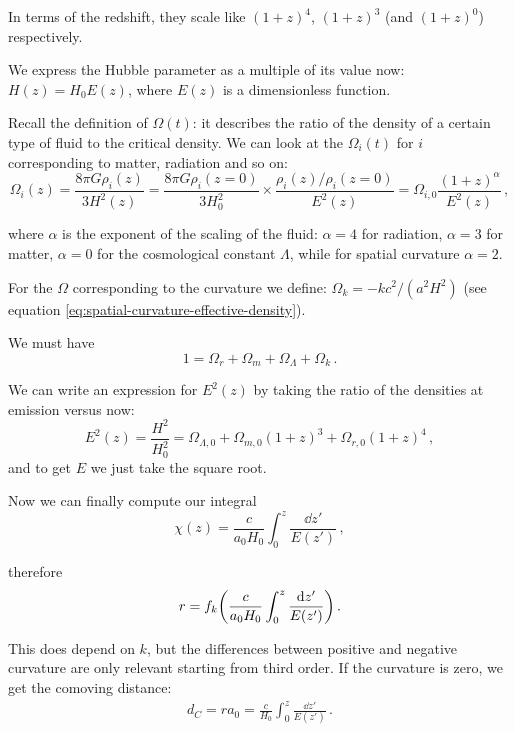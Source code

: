 \documentclass[main.tex]{subfiles}
\begin{document}
In terms of the redshift, they scale like \((1+z)^{4}\), \((1+z)^{3}\) (and \((1+z)^{0}\)) respectively.

We express the Hubble parameter as a multiple of its value now: \(H(z) = H_0 E(z)\), where \(E(z)\) is a dimensionless function.

Recall the definition of \(\Omega (t)\): it describes the ratio of the density of a certain type of fluid to the critical density. We can look at the \(\Omega_i (t)\) for \(i\) corresponding to matter, radiation and so on: 
%
\begin{equation}
  \Omega _i (z) = \frac{8 \pi G \rho _i (z)}{3 H^2(z)}
  = \frac{8 \pi G \rho_{i}(z=0)}{3 H_0 ^2} \times  \frac{\rho _i (z) / \rho_{i}(z=0)}{E^2(z)}
  = \Omega _{i,0} \frac{(1+z)^{\alpha }}{E^2(z)}
\,,
\end{equation}

where \(\alpha \) is the exponent of the scaling of the fluid: \(\alpha = 4\) for radiation, \(\alpha = 3\) for matter, \(\alpha = 0\) for the cosmological constant \(\Lambda \), while for spatial curvature \(\alpha = 2\).

For the \(\Omega \) corresponding to the curvature we define: \(\Omega _k = - k c^2/(a^2 H^2)\) (see equation \eqref{eq:spatial-curvature-effective-density}).

We must have 
%
\begin{equation}
  1 = \Omega _r + \Omega _m + \Omega _\Lambda + \Omega _k
\,.
\end{equation}

We can write an expression for \(E^2(z)\) by taking the ratio of the densities at emission versus now:
%
\begin{equation}
  E^2(z) = \frac{H^2}{H_0^2} = 
  \Omega _{\Lambda , 0} +  \Omega_{m, 0} (1+z)^{3}
  +\Omega_{r, 0} (1+z)^4
\,,
\end{equation}
%
and to get \(E\) we just take the square root.

Now we can finally compute our integral 
%
\begin{equation}
  \chi (z) = \frac{c}{a_0 H_0 } \int_{0}^{z} \frac{\dd{z'} }{E(z')}
\,,
\end{equation}
%

therefore 
%
\begin{equation}
  r = f_k \qty(\frac{c}{a_0 H_0 } \int_0^z \frac{\dd{z'}   }{E(z')})
\,.
\end{equation}
%

This does depend on \(k\), but the differences between positive and negative curvature are only relevant starting from third order.
If the curvature is zero, we get the comoving distance:
%
\begin{align}
d_C = r a_0 = \frac{c}{H_0 } \int_{0}^{z} \frac{ \dd{z'}}{E(z')}
\,.
\end{align}
\end{document}

